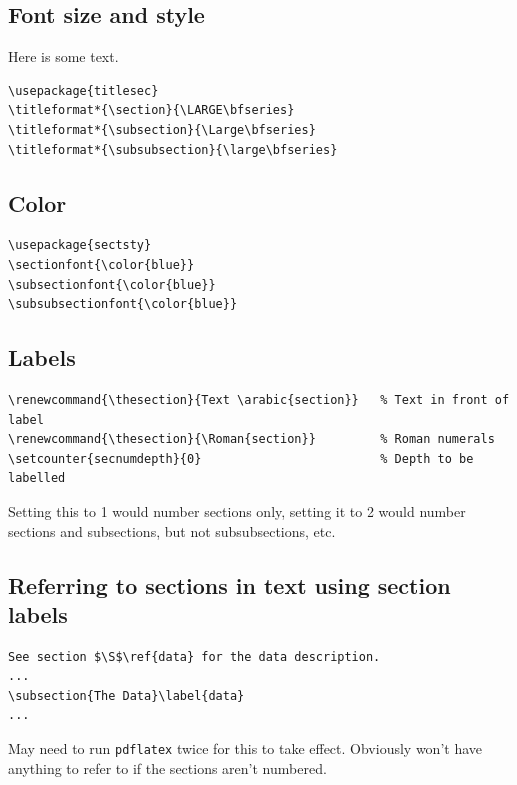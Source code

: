 \documentclass{article}
\begin{document}
\subsection{Font size and style}
Here is some text.
\begin{verbatim}
\usepackage{titlesec}
\titleformat*{\section}{\LARGE\bfseries}
\titleformat*{\subsection}{\Large\bfseries}
\titleformat*{\subsubsection}{\large\bfseries}
\end{verbatim}

\subsection{Color}
\begin{verbatim}
\usepackage{sectsty}
\sectionfont{\color{blue}}
\subsectionfont{\color{blue}}
\subsubsectionfont{\color{blue}}
\end{verbatim}

\subsection{Labels}
\begin{verbatim}
\renewcommand{\thesection}{Text \arabic{section}}   % Text in front of label
\renewcommand{\thesection}{\Roman{section}}         % Roman numerals
\setcounter{secnumdepth}{0}                         % Depth to be labelled
\end{verbatim}
Setting this to 1 would number sections only, setting it to 2 would
number sections and subsections, but not subsubsections, etc.

\subsection{Referring to sections in text using section labels}
\begin{verbatim}
See section $\S$\ref{data} for the data description.
...
\subsection{The Data}\label{data}
...
\end{verbatim}
May need to run \texttt{pdflatex} twice for this to take effect.
Obviously won't have anything to refer to if the sections aren't numbered.
\end{document}
